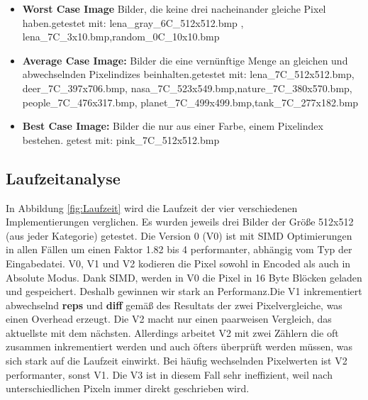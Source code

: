 \documentclass[course=erap]{aspdoc}
\begin{document}
\begin{itemize}
  \item \textbf{Worst Case Image} Bilder, die keine drei nacheinander gleiche Pixel haben.\newline getestet mit: \textcolor{gray1}{lena\_gray\_6C\_512x512.bmp , lena\_7C\_3x10.bmp,\newline random\_0C\_10x10.bmp}
\item \textbf{Average Case Image:} Bilder die eine vernünftige Menge an gleichen und abwechselnden Pixelindizes beinhalten.\newline getestet mit: \textcolor{gray1}{lena\_7C\_512x512.bmp, deer\_7C\_397x706.bmp, nasa\_7C\_523x549.bmp,\newline nature\_7C\_380x570.bmp, people\_7C\_476x317.bmp, planet\_7C\_499x499.bmp,\newline tank\_7C\_277x182.bmp}
  \item \textbf{Best Case Image:} Bilder die nur aus einer Farbe, einem Pixelindex bestehen.\newline
  getest mit: \textcolor{gray1}{pink\_7C\_512x512.bmp}
\end{itemize}

\subsection{Laufzeitanalyse}
In Abbildung \ref{fig:Laufzeit} wird die Laufzeit der vier verschiedenen Implementierungen verglichen. Es wurden jeweils drei Bilder der Größe 512x512 (aus jeder Kategorie) getestet.\newline 
Die Version 0 (V0) ist mit SIMD Optimierungen in allen Fällen um einen Faktor 1.82 bis 4 performanter, abhängig vom Typ der Eingabedatei.\newline
V0, V1 und V2 kodieren die Pixel sowohl in Encoded als auch in Absolute Modus.\newline
Dank SIMD, werden in V0 die Pixel in 16 Byte Blöcken geladen und gespeichert. Deshalb gewinnen wir stark an Performanz.\newline Die V1 inkrementiert abwechselnd \textbf{reps} und \textbf{diff} gemäß des Resultats der zwei Pixelvergleiche, was einen Overhead erzeugt.\newline
Die V2 macht nur einen paarweisen Vergleich, das aktuellste mit dem nächsten. Allerdings arbeitet V2 mit zwei Zählern die oft zusammen inkrementiert werden und auch öfters überprüft werden müssen, was sich stark auf die Laufzeit einwirkt.
Bei häufig wechselnden Pixelwerten ist V2 performanter, sonst V1.
Die V3 ist in diesem Fall sehr ineffizient, weil nach unterschiedlichen Pixeln immer direkt geschrieben wird.
\end{document}
